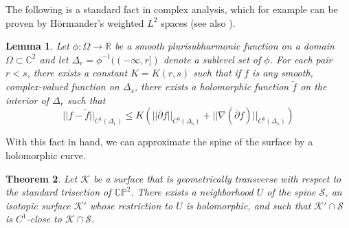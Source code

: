 \documentclass[11pt]{amsart}
\newtheorem{theorem}{Theorem}[section]
\newtheorem{lemma}[theorem]{Lemma}
\theoremstyle{definition}
\theoremstyle{remark}
\numberwithin{equation}{section}
\newcommand{\dbar}{\overline{\del}}
\newcommand{\cK}{\mathcal{K}}
\newcommand{\cS}{\mathcal{S}}
\newcommand{\CC}{\mathbb{C}}
\newcommand{\RR}{\mathbb{R}}
\newcommand{\CP}{\mathbb{CP}}
\newcommand{\del}{\partial}
\begin{document}
The following is a standard fact in complex analysis, which for example can be proven by H\"ormander's weighted $L^2$ spaces \cite{Hormander} (see also \cite[Lemma 28]{Donaldson}).

\begin{lemma}
\label{lemma:stein-approx}
    Let $\phi: \Omega \rightarrow \RR$ be a smooth plurisubharmonic function on a domain $\Omega \subset \CC^2$ and let $\Delta_r = \phi^{-1}((-\infty,r])$ denote a sublevel set of $\phi$.  For each pair $r < s$, there exists a constant $K = K(r,s)$ such that if $f$ is any smooth, complex-valued function on $\Delta_s$, there exists a holomorphic function $\widetilde{f}$ on the interior of $\Delta_r$ such that
    \[ || f - \widetilde{f} ||_{C^1(\Delta_r)} \leq K \left(|| \dbar f ||_{C^0(\Delta_s)} + || \nabla (\dbar f) ||_{C^0(\Delta_s)} \right)\]
\end{lemma}

With this fact in hand, we can approximate the spine of the surface by a holomorphic curve.

\begin{theorem}
\label{thrm:holomorphic-ribbon}
    Let $\cK$ be a surface that is geometrically transverse with respect to the standard trisection of $\CP^2$.  There exists a neighborhood $U$ of the spine $\cS$, an isotopic surface $\cK'$ whose restriction to $U$ is holomorphic, and such that $\cK' \cap \cS$ is $C^{1}$-close to $\cK \cap \cS$.
\end{theorem}
\end{document}
